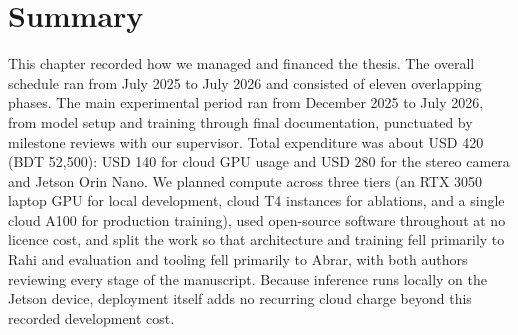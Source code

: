 \section{Summary}
\label{sec:8-6}
This chapter recorded how we managed and financed the thesis. The
overall schedule ran from July 2025 to July 2026 and consisted of
eleven overlapping phases. The main experimental period ran from
December 2025 to July 2026, from model setup and training through final documentation,
punctuated by milestone reviews with our supervisor. Total expenditure was about
USD 420 (BDT 52,500): USD 140 for cloud GPU usage and USD 280 for the
stereo camera and Jetson Orin Nano. We planned compute across three
tiers (an RTX 3050 laptop GPU for local development, cloud T4 instances
for ablations, and a single cloud A100 for production training), used
open-source software throughout at no licence cost, and split the work
so that architecture and training fell primarily to Rahi and evaluation
and tooling fell primarily to Abrar, with both authors reviewing every
stage of the manuscript. Because inference runs locally on the Jetson
device, deployment itself adds no recurring cloud charge beyond this
recorded development cost.

